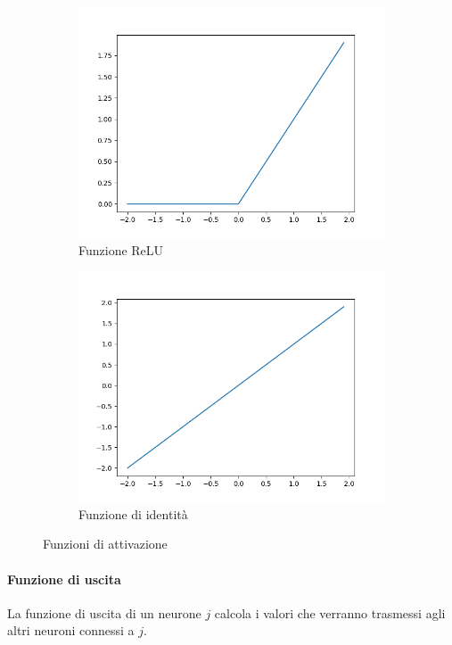 \documentclass[12pt, twoside, letterpaper]{report}
\begin{document}
\begin{figure}[h]
				\begin{subfigure}[]{.5\textwidth}
					\centering
					\includegraphics[width=.9\linewidth]{relu.png}
					\caption{Funzione ReLU}
					\label{fig:relu}
				\end{subfigure}
				\hfill
				\begin{subfigure}[]{.5\textwidth}
					\centering
					\includegraphics[width=.9\linewidth]{identity.png}
					\caption{Funzione di identità}
					\label{fig:identity}
				\end{subfigure}
				
				\caption{Funzioni di attivazione}
				\label{fig:funzioni di attivazione}
			\end{figure}	
			 	
			 \paragraph{Funzione di uscita} La funzione di uscita di un neurone $j$ calcola i valori che verranno trasmessi agli altri neuroni connessi a $j$. 
			 
\end{document}
